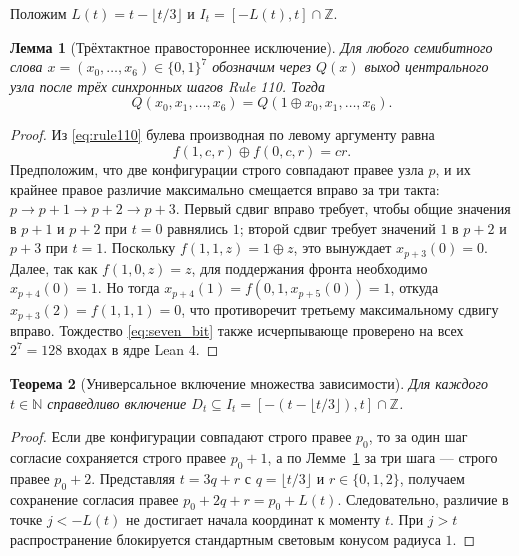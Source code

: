 \documentclass[11pt, a4paper]{article}
\newtheorem{theorem}{Теорема}[section]
\newtheorem{lemma}[theorem]{Лемма}
\begin{document}
Положим $L(t) = t - \lfloor t/3 \rfloor$ и $I_t = [-L(t), t] \cap \mathbb{Z}$.

\begin{lemma}[Трёхтактное правостороннее исключение]\label{lem:three_step}
Для любого семибитного слова $x = (x_0, \dots, x_6) \in \{0, 1\}^7$ обозначим через $Q(x)$ выход центрального узла после трёх синхронных шагов Rule 110. Тогда
\begin{equation}\label{eq:seven_bit}
Q(x_0, x_1, \dots, x_6) = Q(1 \oplus x_0, x_1, \dots, x_6).
\end{equation}
\end{lemma}

\begin{proof}
Из \eqref{eq:rule110} булева производная по левому аргументу равна
\begin{equation}\label{eq:bool_deriv}
f(1, c, r) \oplus f(0, c, r) = cr.
\end{equation}
Предположим, что две конфигурации строго совпадают правее узла $p$, и их крайнее правое различие максимально смещается вправо за три такта: $p \to p+1 \to p+2 \to p+3$. Первый сдвиг вправо требует, чтобы общие значения в $p+1$ и $p+2$ при $t=0$ равнялись $1$; второй сдвиг требует значений $1$ в $p+2$ и $p+3$ при $t=1$. Поскольку $f(1, 1, z) = 1 \oplus z$, это вынуждает $x_{p+3}(0) = 0$. Далее, так как $f(1, 0, z) = z$, для поддержания фронта необходимо $x_{p+4}(0) = 1$. Но тогда $x_{p+4}(1) = f(0, 1, x_{p+5}(0)) = 1$, откуда $x_{p+3}(2) = f(1, 1, 1) = 0$, что противоречит третьему максимальному сдвигу вправо. Тождество \eqref{eq:seven_bit} также исчерпывающе проверено на всех $2^7 = 128$ входах в ядре Lean 4.
\end{proof}

\begin{theorem}[Универсальное включение множества зависимости]\label{thm:upper_bound}
Для каждого $t \in \mathbb{N}$ справедливо включение $D_t \subseteq I_t = [-(t - \lfloor t/3 \rfloor), t] \cap \mathbb{Z}$.
\end{theorem}

\begin{proof}
Если две конфигурации совпадают строго правее $p_0$, то за один шаг согласие сохраняется строго правее $p_0 + 1$, а по Лемме~\ref{lem:three_step} за три шага — строго правее $p_0 + 2$. Представляя $t = 3q + r$ с $q = \lfloor t/3 \rfloor$ и $r \in \{0, 1, 2\}$, получаем сохранение согласия правее $p_0 + 2q + r = p_0 + L(t)$. Следовательно, различие в точке $j < -L(t)$ не достигает начала координат к моменту $t$. При $j > t$ распространение блокируется стандартным световым конусом радиуса $1$.
\end{proof}
\end{document}
